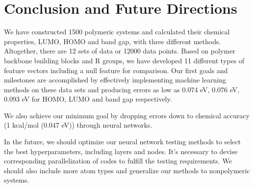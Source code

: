 \section{Conclusion and Future Directions}


We have constructed 1500 polymeric systems and calculated their chemical properties, LUMO, HOMO and band gap, with three different methods. Altogether, there are 12 sets of data or 12000 data points. Based on polymer backbone building blocks and R groups, we have developed 11 different types of feature vectors including a null feature for comparison. Our first goals and milestones are accomplished by effectively implementing machine learning methods on these data sets and producing errors as low as 0.074 eV, 0.076 eV, 0.093 eV for HOMO, LUMO and band gap respectively.

We also achieve our minimum goal by dropping errors down to chemical accuracy (1 kcal/mol (0.047 eV)) through neural networks.

In the future, we should optimize our neural network testing methods to select the best hyperparameters, including layers and nodes. It's necessary to devise corresponding parallelization of codes to fulfill the testing requirements. We should also include more atom types and generalize our methods to nonpolymeric systems.   
